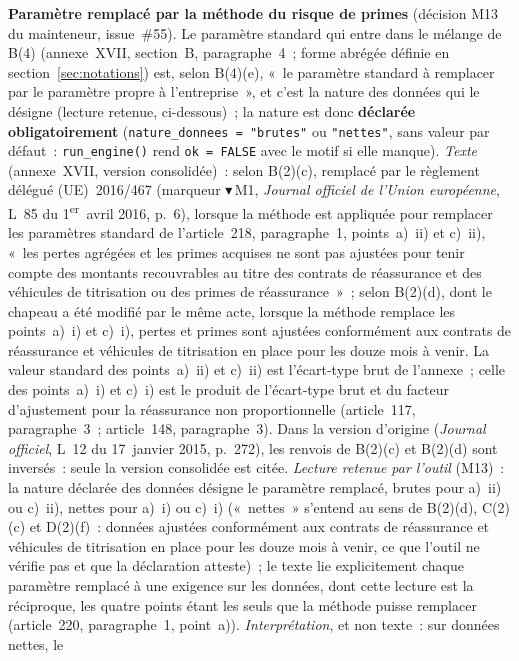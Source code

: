 \documentclass[a4paper,11pt]{article}
\newcommand{\code}[1]{\texttt{\small #1}}
\begin{document}
\begin{encadre}
\smallskip
\textbf{Paramètre remplacé par la méthode du risque de primes} (décision M13 du mainteneur,
issue~\#55). Le paramètre standard qui entre dans le mélange de B(4) (annexe~XVII, section~B,
paragraphe~4~; forme abrégée définie en section~\ref{sec:notations}) est, selon B(4)(e),
«~le paramètre standard à remplacer par le paramètre propre à l'entreprise~», et c'est la
nature des données qui le désigne (lecture retenue, ci-dessous)~; la nature est donc
\textbf{déclarée obligatoirement} (\code{nature\_donnees = "brutes"} ou \code{"nettes"}, sans
valeur par défaut~: \code{run\_engine()} rend \code{ok = FALSE} avec le motif si elle manque).
\emph{Texte} (annexe~XVII, version consolidée)~: selon B(2)(c), remplacé par le règlement
délégué (UE)~2016/467 (marqueur $\blacktriangledown$\,M1, \emph{Journal officiel de l'Union
européenne}, L~85 du 1\textsuperscript{er}~avril 2016, p.~6), lorsque la méthode est appliquée
pour remplacer les paramètres standard de l'article~218, paragraphe~1, points~a)~ii) et c)~ii),
«~les pertes agrégées et les primes acquises ne sont pas ajustées pour tenir compte des montants
recouvrables au titre des contrats de réassurance et des véhicules de titrisation ou des primes
de réassurance~»~; selon B(2)(d), dont le chapeau a été modifié par le même acte, lorsque
la méthode remplace les points~a)~i) et c)~i), pertes et primes sont ajustées conformément aux
contrats de réassurance et véhicules de titrisation en place pour les douze mois à venir. La
valeur standard des points~a)~ii) et c)~ii) est l'écart-type brut de l'annexe~; celle des
points~a)~i) et c)~i) est le produit de l'écart-type brut et du facteur d'ajustement pour la
réassurance non proportionnelle (article~117, paragraphe~3~; article~148, paragraphe~3). Dans la
version d'origine (\emph{Journal officiel}, L~12 du 17~janvier 2015, p.~272), les renvois de
B(2)(c) et B(2)(d) sont inversés~: seule la version consolidée est citée. \emph{Lecture
retenue par l'outil} (M13)~: la nature déclarée des données désigne le paramètre remplacé,
brutes pour a)~ii) ou c)~ii), nettes pour a)~i) ou c)~i) («~nettes~» s'entend au sens de
B(2)(d), C(2)(c) et D(2)(f)~: données ajustées conformément aux contrats de réassurance et
véhicules de titrisation en place pour les douze mois à venir, ce que l'outil ne vérifie pas et
que la déclaration atteste)~; le texte lie explicitement chaque paramètre remplacé à une
exigence sur les données, dont cette lecture est la réciproque, les quatre points étant les
seuls que la méthode puisse remplacer (article~220, paragraphe~1, point~a)).
\emph{Interprétation}, et non texte~: sur données nettes, le

\end{encadre}
\end{document}
